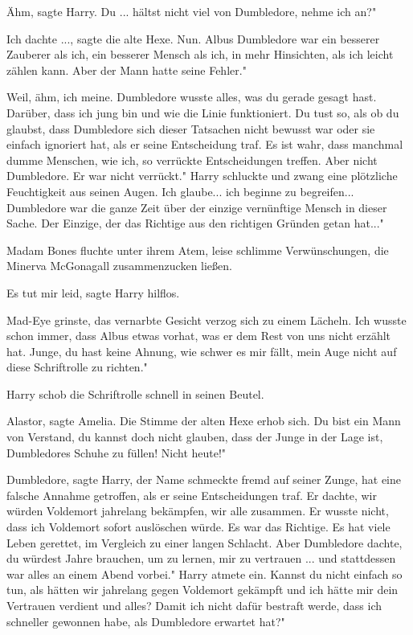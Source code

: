 \glqq{}Ähm\grqq{}, sagte Harry. \glqq{}Du ... hältst nicht viel von Dumbledore,
nehme ich an?"

\glqq{}Ich dachte ...\grqq{}, sagte die alte Hexe. \glqq{}Nun. Albus Dumbledore
war ein besserer Zauberer als ich, ein besserer Mensch als ich, in mehr
Hinsichten, als ich leicht zählen kann. Aber der Mann hatte seine Fehler."

\glqq{}Weil, ähm, ich meine. Dumbledore wusste alles, was du gerade gesagt hast.
Darüber, dass ich jung bin und wie die Linie funktioniert. Du tust so, als ob du
glaubst, dass Dumbledore sich dieser Tatsachen nicht bewusst war oder sie
einfach ignoriert hat, als er seine Entscheidung traf. Es ist wahr, dass
manchmal dumme Menschen, wie ich, so verrückte Entscheidungen treffen. Aber
nicht Dumbledore. Er war nicht verrückt." Harry schluckte und zwang eine
plötzliche Feuchtigkeit aus seinen Augen. \glqq{}Ich glaube... ich beginne zu
begreifen... Dumbledore war die ganze Zeit über der einzige vernünftige Mensch
in dieser Sache. Der Einzige, der das Richtige aus den richtigen Gründen getan
hat..."

Madam Bones fluchte unter ihrem Atem, leise schlimme Verwünschungen, die Minerva
McGonagall zusammenzucken ließen.

\glqq{}Es tut mir leid\grqq{}, sagte Harry hilflos.

Mad-Eye grinste, das vernarbte Gesicht verzog sich zu einem Lächeln. \glqq{}Ich
wusste schon immer, dass Albus etwas vorhat, was er dem Rest von uns nicht
erzählt hat. Junge, du hast keine Ahnung, wie schwer es mir fällt, mein Auge
nicht auf diese Schriftrolle zu richten."

Harry schob die Schriftrolle schnell in seinen Beutel.

\glqq{}Alastor\grqq{}, sagte Amelia. Die Stimme der alten Hexe erhob sich. \glqq
Du bist ein Mann von Verstand, du kannst doch nicht glauben, dass der Junge in
der Lage ist, Dumbledores Schuhe zu füllen! Nicht heute!"

\glqq{}Dumbledore\grqq{}, sagte Harry, der Name schmeckte fremd auf seiner Zunge,
\glqq{}hat eine falsche Annahme getroffen, als er seine Entscheidungen traf. Er
dachte, wir würden Voldemort jahrelang bekämpfen, wir alle zusammen. Er wusste
nicht, dass ich Voldemort sofort auslöschen würde. Es war das Richtige. Es hat
viele Leben gerettet, im Vergleich zu einer langen Schlacht. Aber Dumbledore
dachte, du würdest Jahre brauchen, um zu lernen, mir zu vertrauen ... und
stattdessen war alles an einem Abend vorbei." Harry atmete ein. \glqq{}Kannst du
nicht einfach so tun, als hätten wir jahrelang gegen Voldemort gekämpft und ich
hätte mir dein Vertrauen verdient und alles? Damit ich nicht dafür bestraft
werde, dass ich schneller gewonnen habe, als Dumbledore erwartet hat?"

